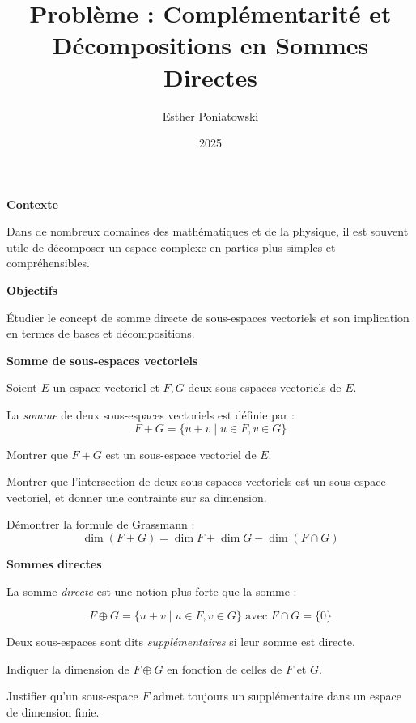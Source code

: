 \documentclass[10pt,a4paper]{article}
\title{Problème : Complémentarité et Décompositions en Sommes Directes}
\author{Esther Poniatowski}
\date{2025}
\begin{document}
\textbf{Contexte}

Dans de nombreux domaines des mathématiques et de la physique, il est souvent utile de décomposer un
espace complexe en parties plus simples et compréhensibles.


\bigskip
\textbf{Objectifs}

Étudier le concept de somme directe de sous-espaces vectoriels et son implication en termes de
bases et décompositions.

\bigskip
\textbf{Somme de sous-espaces vectoriels}

Soient $E$ un espace vectoriel et $F, G$ deux sous-espaces vectoriels de $E$.

La \textit{somme} de deux sous-espaces vectoriels est définie par :
\[
F + G = \{ u + v \mid u \in F, v \in G \}
\]

\q Montrer que $F+G$ est un sous-espace vectoriel de $E$.

\q Montrer que l'intersection de deux sous-espaces vectoriels est un sous-espace vectoriel, et
donner une contrainte sur sa dimension.

\q Démontrer la formule de Grassmann :
\[
\dim (F+G) = \dim F + \dim G - \dim(F \cap G)
\]

\textbf{Sommes directes}

La somme \textit{directe} est une notion plus forte que la somme :

\[
F \oplus G = \{ u + v \mid u \in F, v \in G \} \text{ avec } F \cap G = \{0\}
\]

Deux sous-espaces sont dits \textit{supplémentaires} si leur somme est directe.

\q Indiquer la dimension de $F \oplus G$ en fonction de celles de $F$ et $G$.

\q Justifier qu'un sous-espace $F$ admet toujours un supplémentaire dans un espace de dimension finie.
\end{document}
